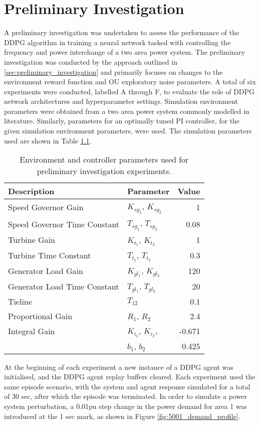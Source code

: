 \chapter{Preliminary Investigation}
A preliminary investigation was undertaken to assess the performance of the DDPG algorithm in training a neural network tasked with controlling the frequency and power interchange of a two area power system. The preliminary investigation was conducted by the approach outlined in \textsection \ref{sec:preliminary_investigation} and primarily focuses on changes to the environment reward function and OU exploratory noise parameters. A total of six experiments were conducted, labelled A through F, to evaluate the role of DDPG network architectures and hyperparameter settings. Simulation environment parameters were obtained from a two area power system commonly modelled in literature. Similarly, parameters for an optimally tuned PI controller, for the given simulation environment parameters, were used. The simulation parameters used are shown in Table \ref{tab:5000}.
\begin{table}[h]
	\centering
	\caption{Environment and controller parameters used for preliminary investigation experiments.}
	\begin{tabular}{llr}
		\toprule
		\textbf{Description} & \textbf{Parameter} & \textbf{Value} \\
		\midrule
		Speed Governor Gain & $K_{sg_1}$, $K_{sg_2}$ & 1 \\
		Speed Governor Time Constant & $T_{sg_1}$, $T_{sg_2}$ & 0.08 \\
		Turbine Gain & $K_{t_1}$, $K_{t_2}$ & 1 \\
		Turbine Time Constant & $T_{t_1}$, $T_{t_2}$ & 0.3 \\
		Generator Load Gain & $K_{gl_1}$, $K_{gl_2}$ & 120 \\
		Generator Load Time Constant & $T_{gl_1}$, $T_{gl_2}$ & 20 \\
		Tieline & $T_{12}$ & 0.1 \\
		Proportional Gain & $R_1$, $R_2$ & 2.4 \\
		Integral Gain & $K_{i_1}$, $K_{i_2}$, & -0.671 \\
		 & $b_1$, $b_2$ & 0.425 \\
		\bottomrule
	\end{tabular}\label{tab:5000}
\end{table}

At the beginning of each experiment a new instance of a DDPG agent was initialised, and the DDPG agent replay buffers cleared. Each experiment used the same episode scenario, with the system and agent response simulated for a total of 30 sec, after which the episode was terminated. In order to simulate a power system perturbation, a 0.01pu step change in the power demand for area 1 was introduced at the 1 sec mark, as shown in Figure \ref{fig:5001_demand_profile}.


